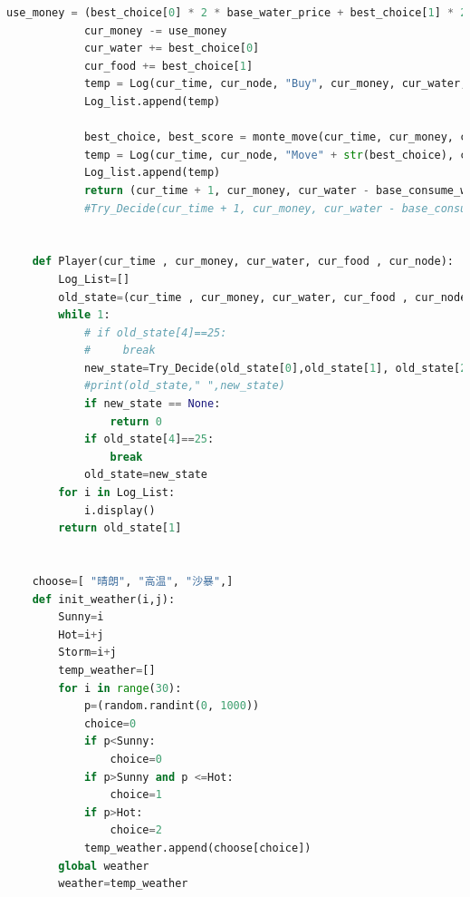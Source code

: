 \documentclass[withoutpreface,bwprint]{cumcmthesis} %
\begin{document}
\begin{appendices}
\begin{lstlisting}[language=python]
            use_money = (best_choice[0] * 2 * base_water_price + best_choice[1] * 2 * base_food_price)
            cur_money -= use_money
            cur_water += best_choice[0]
            cur_food += best_choice[1]
            temp = Log(cur_time, cur_node, "Buy", cur_money, cur_water, cur_food)
            Log_list.append(temp)
    
            best_choice, best_score = monte_move(cur_time, cur_money, cur_water, cur_food, cur_node, Try_time)
            temp = Log(cur_time, cur_node, "Move" + str(best_choice), cur_money, cur_water, cur_food)
            Log_list.append(temp)
            return (cur_time + 1, cur_money, cur_water - base_consume_water[0] * 2, cur_food - base_consume_food[0] * 2, best_choice)
            #Try_Decide(cur_time + 1, cur_money, cur_water - base_consume_water[0] * 2, cur_food - base_consume_food[0] * 2, best_choice, Log_list)
    
    
    def Player(cur_time , cur_money, cur_water, cur_food , cur_node):
        Log_List=[]
        old_state=(cur_time , cur_money, cur_water, cur_food , cur_node)
        while 1:
            # if old_state[4]==25:
            #     break
            new_state=Try_Decide(old_state[0],old_state[1], old_state[2], old_state[3] , old_state[4],Log_List)
            #print(old_state," ",new_state)
            if new_state == None:
                return 0
            if old_state[4]==25:
                break
            old_state=new_state
        for i in Log_List:
            i.display()
        return old_state[1]
    
    
    choose=[ "晴朗", "高温", "沙暴",]
    def init_weather(i,j):
        Sunny=i
        Hot=i+j
        Storm=i+j
        temp_weather=[]
        for i in range(30):
            p=(random.randint(0, 1000))
            choice=0
            if p<Sunny:
                choice=0
            if p>Sunny and p <=Hot:
                choice=1
            if p>Hot:
                choice=2
            temp_weather.append(choose[choice])
        global weather
        weather=temp_weather
    

\end{lstlisting}
\end{appendices}
\end{document}
